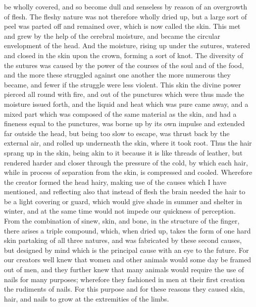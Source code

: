 be wholly covered, and so become dull and senseless by reason of an
overgrowth of flesh. The fleshy nature was not therefore wholly dried up,
but a large sort of peel was parted off and remained over, which is now
called the skin. This met and grew by the help of the cerebral moisture,
and became the circular envelopment of the head. And the moisture, rising
up under the sutures, watered and closed in the skin upon the crown,
forming a sort of knot. The diversity of the sutures was caused by the
power of the courses of the soul and of the food, and the more these
struggled against one another the more numerous they became, and fewer if
the struggle were less violent. This skin the divine power pierced all
round with fire, and out of the punctures which were thus made the
moisture issued forth, and the liquid and heat which was pure came away,
and a mixed part which was composed of the same material as the skin, and
had a fineness equal to the punctures, was borne up by its own impulse and
extended far outside the head, but being too slow to escape, was thrust
back by the external air, and rolled up underneath the skin, where it took
root. Thus the hair sprang up in the skin, being akin to it because it is
like threads of leather, but rendered harder and closer through the
pressure of the cold, by which each hair, while in process of separation
from the skin, is compressed and cooled. Wherefore the creator formed the
head hairy, making use of the causes which I have mentioned, and
reflecting also that instead of flesh the brain needed the hair to be a
light covering or guard, which would give shade in summer and shelter in
winter, and at the same time would not impede our quickness of perception.
From the combination of sinew, skin, and bone, in the structure of the
finger, there arises a triple compound, which, when dried up, takes the
form of one hard skin partaking of all three natures, and was fabricated
by these second causes, but designed by mind which is the principal cause
with an eye to the future. For our creators well knew that women and other
animals would some day be framed out of men, and they further knew that
many animals would require the use of nails for many purposes; wherefore
they fashioned in men at their first creation the rudiments of nails. For
this purpose and for these reasons they caused skin, hair, and nails to
grow at the extremities of the limbs.

